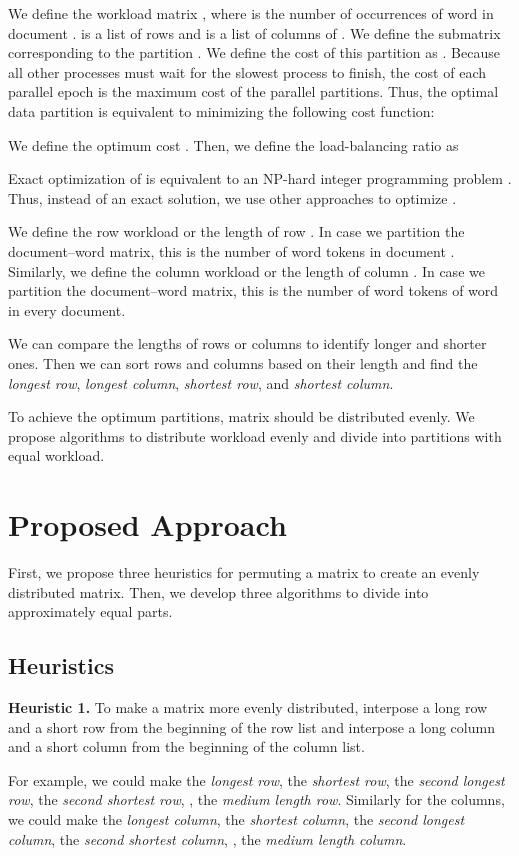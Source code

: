 \documentclass[10pt,conference]{IEEEtran}
\begin{document}
We define the workload matrix , where  is the number of occurrences of word  in document .  is a list of rows and  is a list of columns of . We define the submatrix  corresponding to the partition . We define the cost of this partition as . Because all other processes must wait for the slowest process to finish, the cost of each parallel epoch is the maximum cost of the parallel partitions. Thus, the optimal data partition is equivalent to minimizing the following cost function:

We define the optimum cost . Then, we define the load-balancing ratio  as 


Exact optimization of  is equivalent to an NP-hard integer programming problem \cite{boyd2004convex}. Thus, instead of an exact solution, we use other approaches to optimize .

We define the row workload or the length of row . In case we partition the document--word matrix, this is the number of word tokens in document . Similarly, we define the column workload or the length of column . In case we partition the document--word matrix, this is the number of word tokens of word  in every document.

We can compare the lengths of rows or columns to identify longer and shorter ones. Then we can sort rows and columns based on their length and find the \textit{longest row}, \textit{longest column}, \textit{shortest row}, and \textit{shortest column}.

To achieve the optimum partitions, matrix  should be distributed evenly. We propose algorithms to distribute workload evenly and divide  into partitions with equal workload.

\section{Proposed Approach}
First, we propose three heuristics for permuting a matrix to create an evenly distributed matrix. Then, we develop three algorithms to divide  into  approximately equal parts.

\subsection{Heuristics}
\textbf{Heuristic 1.} To make a matrix more evenly distributed, interpose a long row and a short row from the beginning of the row list and interpose a long column and a short column from the beginning of the column list.

For example, we could make  the \textit{longest row},  the \textit{shortest row},  the \textit{second longest row},  the \textit{second shortest row}, ,  the \textit{medium length row}. Similarly for the columns, we could make  the \textit{longest column},  the \textit{shortest column},  the \textit{second longest column},  the \textit{second shortest column}, ,  the \textit{medium length column}.
\end{document}
